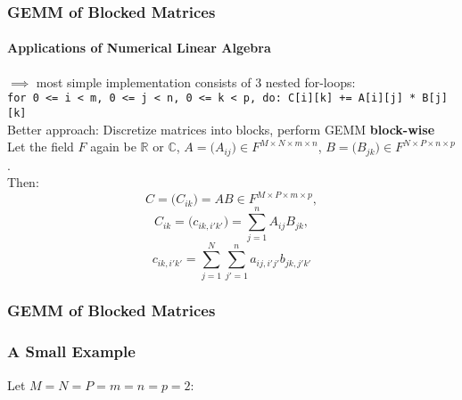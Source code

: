 \begin{frame}
\frametitle{GEMM of Blocked Matrices}
\framesubtitle{Applications of Numerical Linear Algebra}
\(\implies\) most simple implementation consists of 3 nested for-loops: \\
\vspace{0.005cm}\texttt{for 0 <= i < m, 0 <= j < n, 0 <= k < p, do: C[i][k] += A[i][j] * B[j][k]}\\
\vspace{0.25cm}Better approach: Discretize matrices into blocks, perform GEMM \textbf{block-wise}\\
\vspace{0.005cm}Let the field \(F\) again be \(\mathbb{R}\) or \(\mathbb{C}\),
\(A =\big( A_{ij} \big) \in F^{M \times N \times m \times n}\),
\(B =\big( B_{jk} \big) \in F^{N \times P \times n \times p}\).\\
\vspace{0.005cm}Then:
\begin{equation}
 C=\big( C_{ik} \big)=AB \in F^{M \times P \times m \times p},
\end{equation}
\begin{equation}
 C_{ik} = \big( c_{ik,i'k'} \big) = \sum_{j=1}^n{A_{ij}B_{jk}},
\end{equation}
\begin{equation}
 c_{ik,i'k'} = \sum_{j=1}^N{\sum_{j'=1}^n{a_{ij,i'j'}b_{jk,j'k'}}}
\end{equation}
\end{frame}

\begin{frame}
\frametitle{GEMM of Blocked Matrices}
\frametitle{A Small Example}
Let \(M = N = P = m = n = p = 2\):
\vspace{0.3cm}
\begin{center}
\end{center}
\end{frame}

